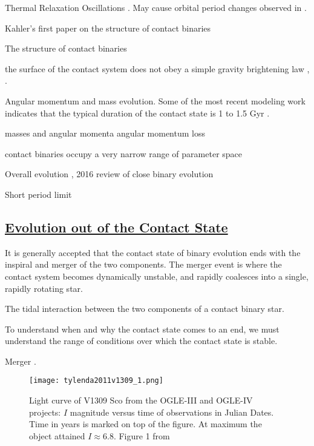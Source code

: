 \documentclass[12pt]{article} %
\numberwithin{equation}{section} %
\begin{document}
Thermal Relaxation Oscillations \citep{wang1994thermal}. May cause orbital period changes observed in \citet{qian2001orbital}.

Kahler's first paper on the structure of contact binaries \citep{kahler2002structure}

The structure of contact binaries \citep{kahler2004structure}

the surface of the contact system does not obey a simple gravity brightening law \citep{kahler2004structure}, \citep{hilditch1988evolutionary}.

\citep{rubenstein2001effect}

Angular momentum and mass evolution. Some of the most recent modeling work indicates that the typical duration of the contact state is 1 to 1.5 Gyr \citep{gazeas2008angular}.

masses and angular momenta \citep{gazeas2006masses} angular momentum loss \citep{vilhu1981contact}

contact binaries occupy a very narrow range of parameter space \citep{gazeas2009physical} \citep{awadalla2005absolute}

Overall evolution \citep{stepien2008evolutionary}, 2016 review of close binary evolution \citep{tutukov2016evolution}

Short period limit \citep{rucinski2007short} \citep{drake2014ultra} \cite{lohr2012period} \citep{rucinski1992can}

\subsection[Evolution out of the Contact State]{\hyperlink{toc}{Evolution out of the Contact State}}

It is generally accepted that the contact state of binary evolution ends with the inspiral and merger of the two components. The merger event is where the contact system becomes dynamically unstable, and rapidly coalesces into a single, rapidly rotating star. 

The tidal interaction between the two components of a contact binary star.

To understand when and why the contact state comes to an end, we must understand the range of conditions over which the contact state is stable.

Merger \citet{tylenda2011v1309}.

\begin{figure}[H]
\centering
\texttt{[image: tylenda2011v1309\_1.png]}
\caption{Light curve of V1309 Sco from the OGLE-III and OGLE-IV projects: $I$ magnitude versus time of observations in Julian Dates. Time in years is marked on top of the figure. At maximum the object attained $I \approx 6.8$. Figure 1 from \citet{tylenda2011v1309}}
\label{fig: tylenda2011v1309_1}
\end{figure}
\end{document}

